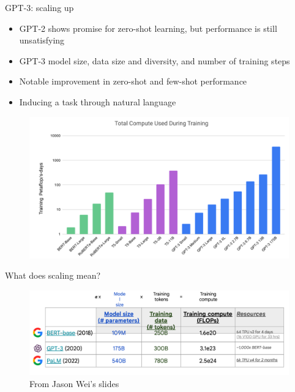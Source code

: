 \documentclass[usenames,dvipsnames,notes,11pt,aspectratio=169,hyperref={colorlinks=true, linkcolor=blue}]{beamer}
\begin{document}
\begin{frame}
    {GPT-3: scaling up}
    \begin{itemize}
        \item GPT-2 shows promise for zero-shot learning, but performance is still unsatisfying
        \item GPT-3  model size, data size and diversity, and number of training steps
        \item Notable improvement in zero-shot and few-shot performance
        \item Inducing a task through natural language  
    \end{itemize}
    \begin{figure}
        \includegraphics[height=0.6\textheight]{figures/gpt3-compute}
    \end{figure}
\end{frame}

\begin{frame}
    {What does scaling mean?}

    \begin{figure}
        \includegraphics[width=\textwidth]{figures/scaling}
        \caption{From Jason Wei's slides}
    \end{figure}
\end{frame}
\end{document}
